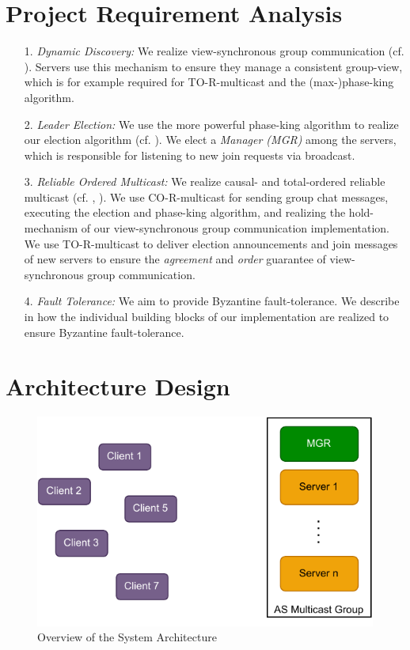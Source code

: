 \documentclass[runningheads]{llncs}
\begin{document}
\section{Project Requirement Analysis} \label{sec:req_analysis}
\begin{enumerate}
    \item[1.] \textit{Dynamic Discovery:} We realize view-synchronous group communication (cf. ). Servers use this mechanism to ensure they manage a consistent group-view, which is for example required for TO-R-multicast and the (max-)phase-king algorithm.
    \item[2.] \textit{Leader Election:} We use the more powerful phase-king algorithm to realize our election algorithm (cf. ). We elect a \textit{Manager (MGR)} among the servers, which is responsible for listening to new join requests via broadcast. 
    \item[3.] \textit{Reliable Ordered Multicast:} We realize causal- and total-ordered reliable multicast (cf. , ). We use CO-R-multicast for sending group chat messages, executing the election and phase-king algorithm, and realizing the hold-mechanism of our view-synchronous group communication implementation. We use TO-R-multicast to deliver election announcements and join messages of new servers to ensure the \textit{agreement} and \textit{order} guarantee of view-synchronous group communication.
    \item[4.] \textit{Fault Tolerance:} We aim to provide Byzantine fault-tolerance. We describe in  how the individual building blocks of our implementation are realized to ensure Byzantine fault-tolerance.
\end{enumerate}

\section{Architecture Design} \label{sec:arch_design}

\begin{figure}[t]
    \centering
    \includegraphics[scale=0.7]{graphics/DS_Architecture.pdf}
    \caption{Overview of the System Architecture}
    \label{fig:overview}
\end{figure}
\end{document}
